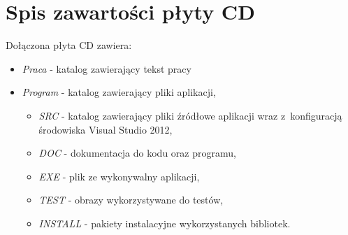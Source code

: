 \chapter{Spis zawartości płyty CD}
\label{cha:zawartoscCD}

Dołączona płyta CD zawiera:
\begin{itemize}
\item \emph{Praca} - katalog zawierający tekst pracy
\item \emph{Program} - katalog zawierający pliki aplikacji,
\begin{itemize}
\item \emph{SRC} - katalog zawierający pliki źródłowe aplikacji wraz z~konfiguracją środowiska Visual Studio 2012,
\item \emph{DOC} - dokumentacja do kodu oraz programu,
\item \emph{EXE} - plik ze wykonywalny aplikacji,
\item \emph{TEST} - obrazy wykorzystywane do testów,
\item \emph{INSTALL} - pakiety instalacyjne wykorzystanych bibliotek.
\end{itemize}
\end{itemize}
